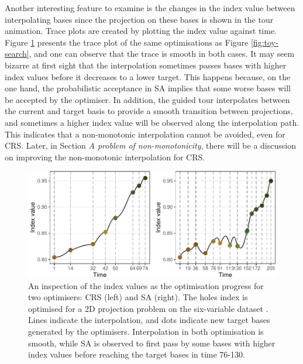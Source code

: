 Another interesting feature to examine is the changes in the index value
between interpolating bases since the projection on these bases is shown
in the tour animation. Trace plots are created by plotting the index
value against time. Figure \ref{fig:toy-interp} presents the trace plot
of the same optimisations as Figure \ref{fig:toy-search}, and one can
observe that the trace is smooth in both cases. It may seem bizarre at
first sight that the interpolation sometimes passes bases with higher
index values before it decreases to a lower target. This happens
because, on the one hand, the probabilistic acceptance in SA implies
that some worse bases will be accepted by the optimiser. In addition,
the guided tour interpolates between the current and target basis to
provide a smooth transition between projections, and sometimes a higher
index value will be observed along the interpolation path. This
indicates that a non-monotonic interpolation cannot be avoided, even for
CRS. Later, in Section \emph{A problem of non-monotonicity}, there will
be a discussion on improving the non-monotonic interpolation for CRS.

\begin{Schunk}
\begin{figure}

{\centering \includegraphics[width=1\linewidth]{figs/toy-interp} 

}

\caption[An inspection of the index values as the optimisation progress for two optimisers]{An inspection of the index values as the optimisation progress for two optimisers: CRS (left) and SA (right). The holes index is optimised for a 2D projection problem on the six-variable dataset . Lines indicate the interpolation, and dots indicate new target bases generated by the optimisers. Interpolation in both optimisation is smooth, while SA is observed to first pass by some bases with higher index values before reaching the target bases in time 76-130.}\label{fig:toy-interp}
\end{figure}
\end{Schunk}

